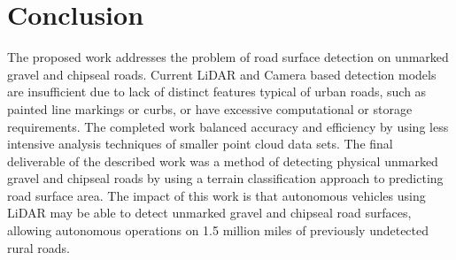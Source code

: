 \documentclass[journal,onecolumn]{IEEEtran}
\begin{document}
	


\section{Conclusion}
	
	{The proposed work addresses the problem of road surface detection on unmarked gravel and chipseal roads. Current LiDAR and Camera based detection models are insufficient due to lack of distinct features typical of urban roads, such as painted line markings or curbs, or have excessive computational or storage requirements. The completed work balanced accuracy and efficiency by using less intensive analysis techniques of smaller point cloud data sets. The final deliverable of the described work was a method of detecting physical unmarked gravel and chipseal roads by using a terrain classification approach to predicting road surface area. The impact of this work is that autonomous vehicles using LiDAR may be able to detect unmarked gravel and chipseal road surfaces, allowing autonomous operations on 1.5 million miles of previously undetected rural roads.}


%
\IEEEpeerreviewmaketitle





%
\end{document}

